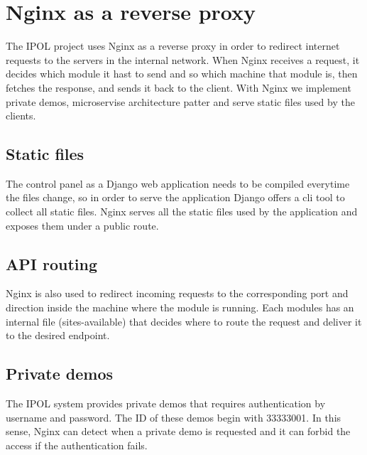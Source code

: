 
\section{Nginx as a reverse proxy}
\label{sec:reverse_proxy}
The IPOL project uses Nginx as a reverse proxy in order to redirect internet requests to the servers in the 
internal network. When Nginx receives a request, it decides which module it hast to send and so which machine that module is, 
then fetches the response, and sends it back to the client. With Nginx we implement private demos, microservise architecture 
patter and serve static files used by the clients.

\subsection{Static files}
The control panel as a Django web application needs to be compiled everytime the files change, so in order to serve the 
application Django offers a cli tool to collect all static files. Nginx serves all the static files used by the application and exposes them 
under a public route.

\subsection{API routing}
Nginx is also used to redirect incoming requests to the corresponding port and direction inside the machine where the module is 
running. Each modules has an internal file (sites-available) that decides where to route the request and deliver it to the desired endpoint.

\subsection{Private demos}
The IPOL system provides private demos that requires authentication by username and password. The ID of these demos begin with 
33333001. In this sense, Nginx can detect when a private demo is requested and it can forbid the access if the authentication fails.
